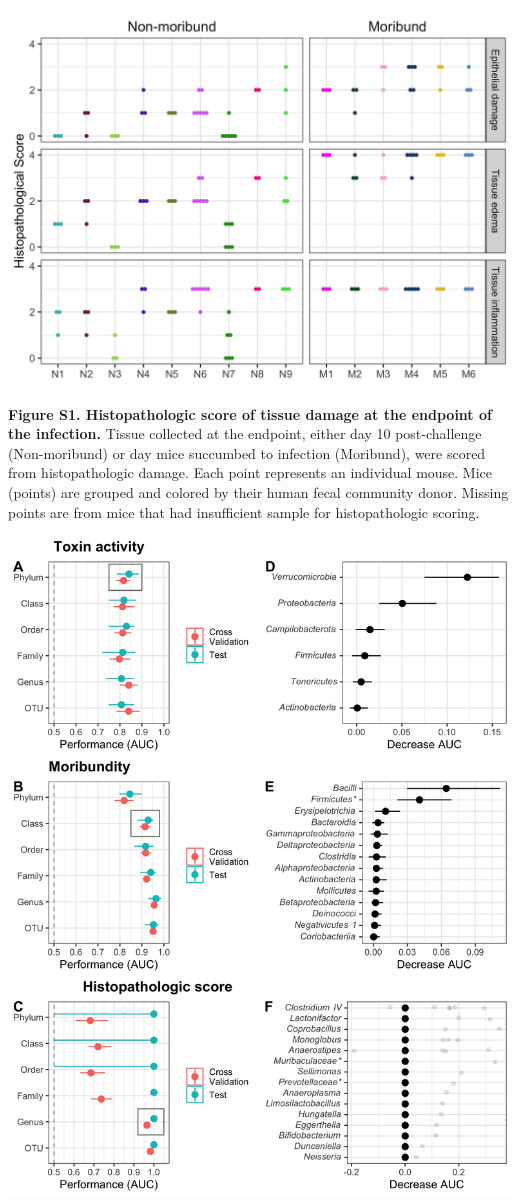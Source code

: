 \documentclass[
  12pt,
]{article}
\begin{document}
\hfill\break

\includegraphics{../results/figures/figure_S1.jpg}

\textbf{Figure S1. Histopathologic score of tissue damage at the
endpoint of the infection.} Tissue collected at the endpoint, either day
10 post-challenge (Non-moribund) or day mice succumbed to infection
(Moribund), were scored from histopathologic damage. Each point
represents an individual mouse. Mice (points) are grouped and colored by
their human fecal community donor. Missing points are from mice that had
insufficient sample for histopathologic scoring.

\hfill\break

\includegraphics{../results/figures/figure_S2.jpg}
\end{document}
